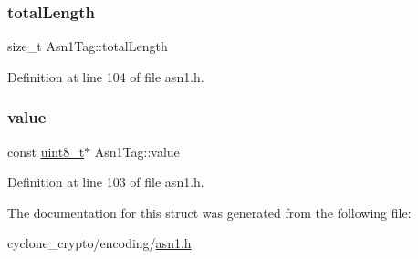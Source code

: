 \mbox{\label{structAsn1Tag_a27df45a2d65de5a2a1289a64e43149bf}} 
\subsubsection{\texorpdfstring{total\+Length}{totalLength}}
{\footnotesize\ttfamily size\+\_\+t Asn1\+Tag\+::total\+Length}



Definition at line 104 of file asn1.\+h.

\mbox{\label{structAsn1Tag_a90f3832fa59c62feb4fb8be9d8b11b29}} 
\subsubsection{\texorpdfstring{value}{value}}
{\footnotesize\ttfamily const \hyperlink{stdint_8h_aba7bc1797add20fe3efdf37ced1182c5}{uint8\+\_\+t}$\ast$ Asn1\+Tag\+::value}



Definition at line 103 of file asn1.\+h.



The documentation for this struct was generated from the following file\+:\begin{DoxyCompactItemize}
\item 
cyclone\+\_\+crypto/encoding/\hyperlink{asn1_8h}{asn1.\+h}\end{DoxyCompactItemize}
